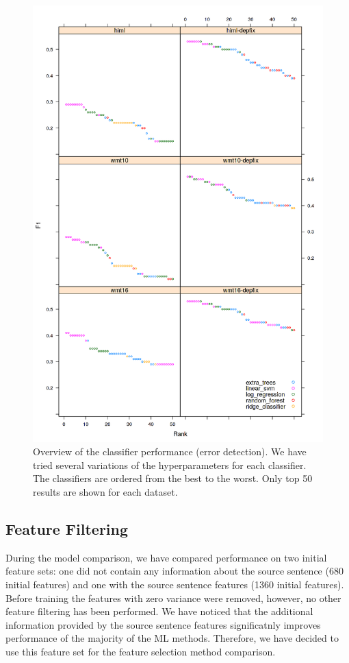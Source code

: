 \begin{figure}
\centering
  \includegraphics[scale=0.7]{wf-class}
  \caption{
    Overview of the classifier performance (error detection).
We have tried several variations of the hyperparameters
for each classifier. The classifiers are ordered from the best to the worst. Only top 50 results
are shown for each dataset.
}
  \label{wf-draft}
\end{figure}

\subsection{Feature Filtering}

During the model comparison, we have compared performance on two initial feature sets:
one did not contain any information about the source sentence (\tilda{}680 initial features)
and one with the source sentence features (\tilda{}1360 initial features). Before training
the features with zero variance were removed, however, no other feature filtering has been
performed. We have noticed that the additional information provided by the source sentence features
significatnly improves performance of the majority of the ML methods. Therefore, we have decided
to use this feature set for the feature selection method comparison.

